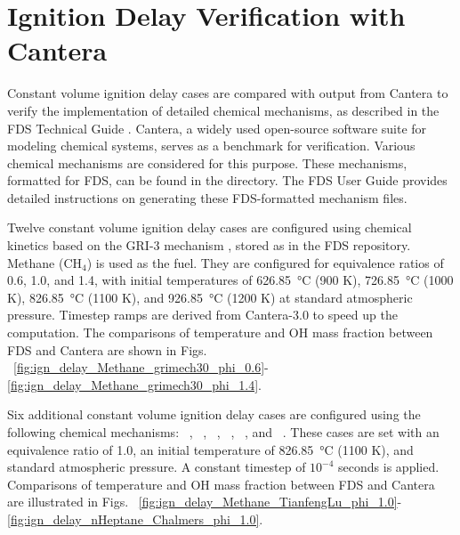 \documentclass[11pt]{book}
\begin{document}
\section{Ignition Delay Verification with Cantera}
\label{ignition_delay}

Constant volume ignition delay cases are compared with output from Cantera \cite{cantera:2023} to verify the implementation of detailed chemical mechanisms, as described in the FDS Technical Guide \cite{FDS_Math_Guide}. Cantera, a widely used open-source software suite for modeling chemical systems, serves as a benchmark for verification. Various chemical mechanisms are considered for this purpose. These mechanisms, formatted for FDS, can be found in the  directory. The FDS User Guide \cite{FDS_Users_Guide} provides detailed instructions on generating these FDS-formatted mechanism files.

Twelve constant volume ignition delay cases are configured using chemical kinetics based on the GRI-3 mechanism \cite{gri3:1999}, stored as  in the FDS repository. Methane ($\mathrm{CH}_4$) is used as the fuel. They are configured for equivalence ratios of 0.6, 1.0, and 1.4, with initial temperatures of 626.85~\unit{\degreeCelsius} (900 K), 726.85~\unit{\degreeCelsius} (1000 K), 826.85~\unit{\degreeCelsius} (1100 K), and 926.85~\unit{\degreeCelsius} (1200 K) at standard atmospheric pressure. Timestep ramps are derived from Cantera-3.0 to speed up the computation. The comparisons of temperature and OH mass fraction between FDS and Cantera are shown in Figs. ~\ref{fig:ign_delay_Methane_grimech30_phi_0.6}-\ref{fig:ign_delay_Methane_grimech30_phi_1.4}.

Six additional constant volume ignition delay cases are configured using the following chemical mechanisms: ~\cite{TianfengLu:2008}, ~\cite{Smooke:1995}, ~\cite{Luo:2012}, ~\cite{Qin:20001}, ~\cite{Zettervall2017}, and ~\cite{Tao:2007}. These cases are set with an equivalence ratio of 1.0, an initial temperature of 826.85~\unit{\degreeCelsius} (1100 K), and standard atmospheric pressure. A constant timestep of $10^{-4}$ seconds is applied. Comparisons of temperature and OH mass fraction between FDS and Cantera are illustrated in Figs. ~\ref{fig:ign_delay_Methane_TianfengLu_phi_1.0}-\ref{fig:ign_delay_nHeptane_Chalmers_phi_1.0}.
\end{document}
